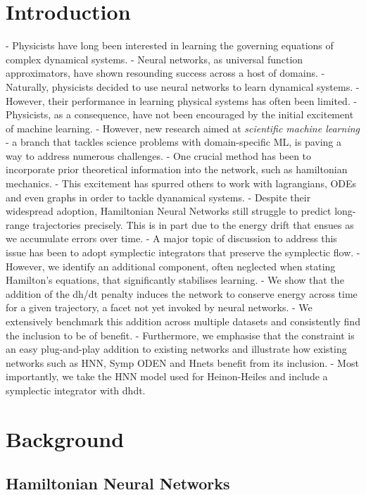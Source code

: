 \documentclass[twoside]{article}
\begin{document}
\section{Introduction}

- Physicists have long been interested in learning the governing equations of complex dynamical systems. 
- Neural networks, as universal function approximators, have shown resounding success across a host of domains.
- Naturally, physicists decided to use neural networks to learn dynamical systems.
- However, their performance in learning physical systems has often been limited.
- Physicists, as a consequence, have not been encouraged by the initial excitement of machine learning.
- However, new research aimed at \textit{scientific machine learning} - a branch that tackles science problems with domain-specific ML, is paving a way to address numerous challenges.
- One crucial method has been to incorporate prior theoretical information into the network, such as hamiltonian mechanics.
- This excitement has spurred others to work with lagrangians, ODEs and even graphs in order to tackle dyanamical systems.
- Despite their widespread adoption, Hamiltonian Neural Networks still struggle to predict long-range trajectories precisely. This is in part due to the energy drift that ensues as we accumulate errors over time.
- A major topic of discussion to address this issue has been to adopt symplectic integrators that preserve the symplectic flow. 
- However, we identify an additional component, often neglected when stating Hamilton's equations, that significantly stabilises learning.
- We show that the addition of the dh/dt penalty induces the network to conserve energy across time for a given trajectory, a facet not yet invoked by neural networks.
- We extensively benchmark this addition across multiple datasets and consistently find the inclusion to be of benefit.
- Furthermore, we emphasise that the constraint is an easy plug-and-play addition to existing networks and illustrate how existing networks such as HNN, Symp ODEN and Hnets benefit from its inclusion.
- Most importantly, we take the HNN model used for Heinon-Heiles and include a symplectic integrator with dhdt.


\section{Background}

\subsection{Hamiltonian Neural Networks}
\end{document}
